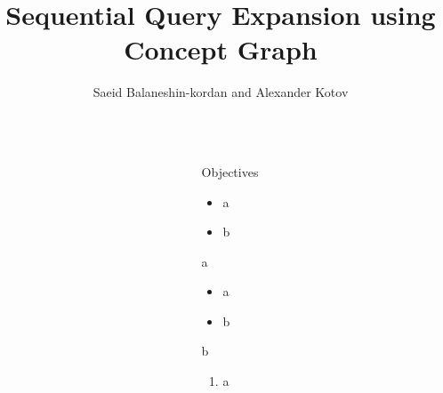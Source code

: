 \documentclass[final]{beamer}
\title{Sequential Query Expansion using Concept Graph} %
\author{  Saeid Balaneshin-kordan and
 Alexander Kotov} %
\institute{Computer Science Department, Wayne State University} %
\newlength{\sepwid}
\newlength{\onecolwid}
\begin{document}

\setlength{\belowcaptionskip}{2ex} %
\setlength\belowdisplayshortskip{2ex} %

\begin{frame}[t] %

\begin{columns}[t] %

\begin{column}{\sepwid}\end{column} %

\begin{column}{\onecolwid} %


\begin{alertblock}{Objectives}
\begin{itemize}
\item a
\item b
\end{itemize}
\end{alertblock}


\begin{block}{a}

\begin{itemize}
\item a

\item b

\end{itemize}
\end{block}



\begin{block}{b}
\begin{enumerate}
\item a


\end{enumerate}
\end{block}
\end{column}
\end{columns}
\end{frame}
\end{document}

